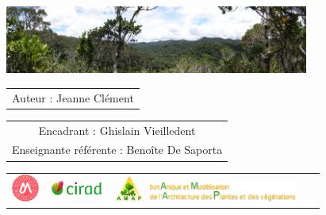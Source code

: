 {

  \begin{frame}
    \vspace{0.25cm}
    \titlepage %
    \vspace{-2.5cm}
    \begin{center}
      \includegraphics[width=10cm]{figs/Banniere.png}
    \end{center}
    \begin{center}
          \vspace{0.2cm}
        \begin{tabular}{c}
         Auteur : Jeanne Clément
        \end{tabular}
    
{\small \begin{tabular}{c}
Encadrant : Ghislain Vieilledent \\
Enseignante référente : Benoîte De Saporta  
\end{tabular}}

      \vspace{0.2cm}

      \begin{tabular}{C{2cm}C{2cm}C{2cm}C{3cm}}
        \includegraphics[height=0.9cm]{figs/logo_UM.jpg} &
        \includegraphics[height=0.6cm]{figs/logo_Cirad.png} &
        \includegraphics[height=0.9cm]{figs/logo_AMAP.png}
        \includegraphics[height=0.7cm]{figs/AMAP-titre-long.png} &
        ~
      \end{tabular}
      
\end{center}
\end{frame}
}
